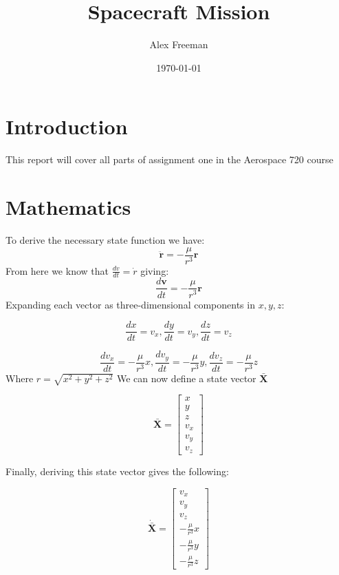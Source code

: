 \documentclass[a4paper, 12pt]{article}  %
\title{Spacecraft Mission}
\author{Alex Freeman}
\date{\today}
\begin{document}
\maketitle

\section{Introduction}
This report will cover all parts of assignment one in the Aerospace 720 course

\section{Mathematics}
To derive the necessary state function we have:
\begin{equation}
    \ddot{\mathbf{r}} = -\frac{\mu}{r^3} \mathbf{r}
\end{equation}
From here we know that $\frac{dv}{dt} = \dot{r}$ giving:
\begin{equation}
    \frac{d\mathbf{v}}{dt} = -\frac{\mu}{r^3} \mathbf{r}
\end{equation}
Expanding each vector as three-dimensional components in $x,y,z$:

\begin{equation}
    \frac{dx}{dt} = v_{x},  \frac{dy}{dt} = v_{y},   \frac{dz}{dt} = v_{z}
\end{equation}


\begin{equation}
    \frac{dv_{x}}{dt} = -\frac{\mu}{r^3} x, \frac{dv_{y}}{dt} = -\frac{\mu}{r^3} y, \frac{dv_{z}}{dt} = -\frac{\mu}{r^3} z
\end{equation}
Where $r = \sqrt{x^{2} + y^{2} + z^{2}}$
\newline
We can now define a state vector $\mathbf{\bar{X}}$


\begin{equation}
    \mathbf{\bar{X}} = 
    \begin{bmatrix}
        x \\
        y \\
        z \\
        v_x \\
        v_y \\
        v_z
        \end{bmatrix}
\end{equation}

Finally, deriving this state vector gives the following:

\begin{equation}
    \mathbf{\dot{\bar{X}}} = 
    \begin{bmatrix}
        v_x \\
        v_y \\
        v_z \\
        -\frac{\mu}{r^3} x \\
        -\frac{\mu}{r^3} y \\
        -\frac{\mu}{r^3} z
        \end{bmatrix}
\end{equation}
\end{document}
